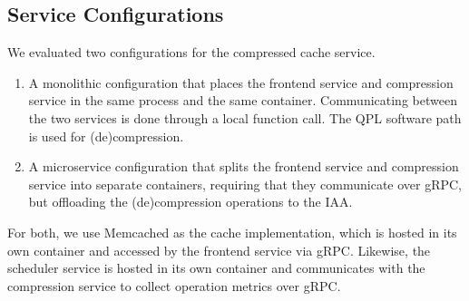 \subsection{Service Configurations}
We evaluated two configurations for the compressed cache service.
\begin{enumerate}
  \item A monolithic configuration that places the frontend service and compression service in the same process and the same container. Communicating between the two services is done through a local function call. The QPL software path is used for (de)compression.
  \item A microservice configuration that splits the frontend service and compression service into separate containers, requiring that they communicate over gRPC, but offloading the (de)compression operations to the IAA.
\end{enumerate}
For both, we use Memcached as the cache implementation, which is hosted in its own container and accessed by the frontend service via gRPC. Likewise, the scheduler service is hosted in its own container and communicates with the compression service to collect operation metrics over gRPC.
